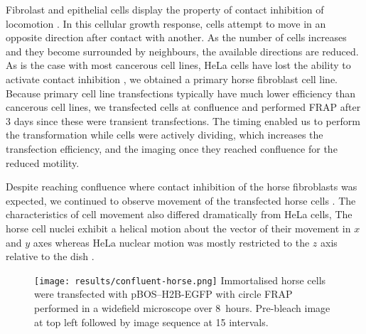 
    Fibrolast and epithelial cells display the property of contact
    inhibition of locomotion \citep{abercrombie1970contact}.
    In this cellular growth response, cells attempt to move in an
    opposite direction after contact with another.  As the number of
    cells increases and they become surrounded by neighbours, the
    available directions are reduced.
    As is the case with most cancerous cell lines, HeLa cells have
    lost the ability to activate contact inhibition
    \citep{stephenson1982locomotory},
    we obtained a primary horse fibroblast cell line.
    Because primary cell line transfections typically have much lower
    efficiency than cancerous cell lines, we transfected cells at
     confluence and performed FRAP after 3 days since these
    were transient transfections.
    The timing enabled us to perform the transformation while cells
    were actively dividing, which increases the transfection
    efficiency, and the imaging once they reached confluence for the
    reduced motility.

    Despite reaching confluence where contact inhibition
    of the horse fibroblasts was expected,
    we continued to observe movement of the transfected
    horse cells .
    The characteristics of cell movement also
    differed dramatically from HeLa cells,
    The horse cell nuclei exhibit a helical motion
    about the vector of their movement
    in $x$ and $y$ axes 
    whereas HeLa nuclear motion was mostly
    restricted to the $z$ axis relative to
    the dish .

    \begin{figure}
      \centering
      \texttt{[image: results/confluent-horse.png]}
        {
          Immortalised horse cells were transfected with pBOS--H2B-EGFP
          with circle FRAP performed in a widefield microscope over 8~hours.
          Pre-bleach image at top left followed by
          image sequence at \SI{15}{\min} intervals.
        }
      \label{fig:kill-frap:confluent-horse}
    \end{figure}

